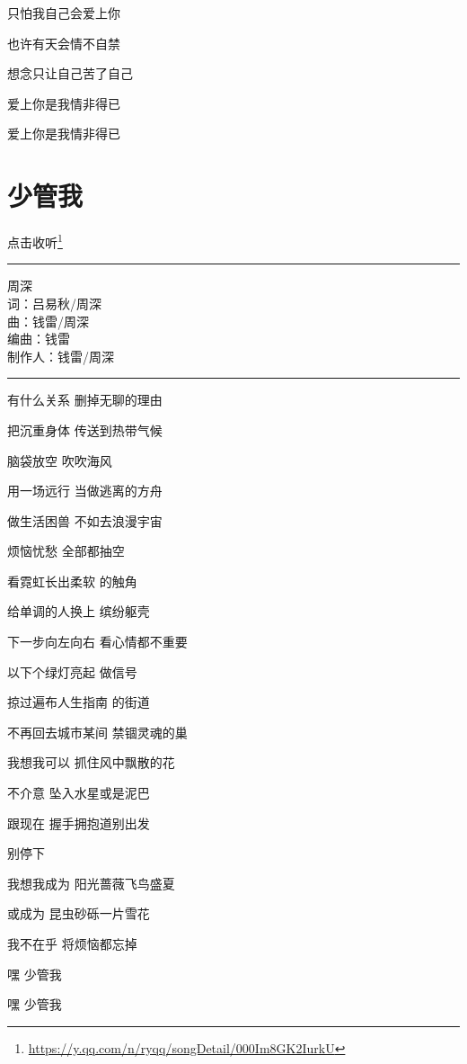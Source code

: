 \documentclass[]{ctexbook}
\renewcommand{\href}[2]{#2\footnote{\url{#1}}}
\begin{document}
只怕我自己会爱上你

也许有天会情不自禁

想念只让自己苦了自己

爱上你是我情非得已

爱上你是我情非得已

\section*{少管我}\label{watch-ur-manners}


\href{https://y.qq.com/n/ryqq/songDetail/000Im8GK2IurkU}{点击收听}

\begin{center}\rule{0.5\linewidth}{0.5pt}\end{center}

周深\\
词：吕易秋/周深\\
曲：钱雷/周深\\
编曲：钱雷\\
制作人：钱雷/周深

\begin{center}\rule{0.5\linewidth}{0.5pt}\end{center}

有什么关系 删掉无聊的理由

把沉重身体 传送到热带气候

脑袋放空 吹吹海风

用一场远行 当做逃离的方舟

做生活困兽 不如去浪漫宇宙

烦恼忧愁 全部都抽空

看霓虹长出柔软 的触角

给单调的人换上 缤纷躯壳

下一步向左向右 看心情都不重要

以下个绿灯亮起 做信号

掠过遍布人生指南 的街道

不再回去城市某间 禁锢灵魂的巢

我想我可以 抓住风中飘散的花

不介意 坠入水星或是泥巴

跟现在 握手拥抱道别出发

别停下

我想我成为 阳光蔷薇飞鸟盛夏

或成为 昆虫砂砾一片雪花

我不在乎 将烦恼都忘掉

嘿 少管我

嘿 少管我
\end{document}
